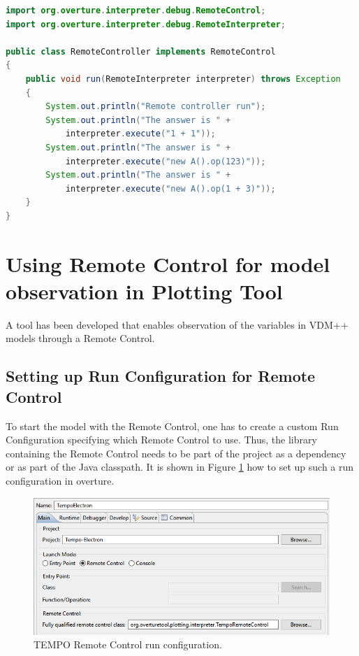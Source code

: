 \documentclass{overturerepchap}
\begin{document}
\begin{lstlisting}[language=JAVA,label=remoteControllerJava,caption=Remote Controller Java class,captionpos=b]
import org.overture.interpreter.debug.RemoteControl;
import org.overture.interpreter.debug.RemoteInterpreter;

public class RemoteController implements RemoteControl
{
	public void run(RemoteInterpreter interpreter) throws Exception
	{
		System.out.println("Remote controller run");
		System.out.println("The answer is " +
			interpreter.execute("1 + 1"));
		System.out.println("The answer is " +
			interpreter.execute("new A().op(123)"));
		System.out.println("The answer is " +
			interpreter.execute("new A().op(1 + 3)"));
	}
}
\end{lstlisting}

\section{Using Remote Control for model observation in Plotting Tool}
A tool has been developed that enables observation of the variables in VDM++ models through a Remote Control.

\subsection{Setting up Run Configuration for Remote Control}
To start the model with the Remote Control, one has to create a custom Run Configuration specifying which Remote Control to use. Thus, the library containing the Remote Control needs to be part of the project as a dependency or as part of the Java classpath. It is shown in Figure \ref{fig:gui:remoteControlCfg} how to set up such a run configuration in overture.

\begin{figure}[!h]
\begin{center}
  \includegraphics[width=\textwidth]{screenDumps/tempo_run_config}
  \caption[labelInTOC]{TEMPO Remote Control run configuration.}
  \label{fig:gui:remoteControlCfg}
\end{center}
\end{figure}
\end{document}
